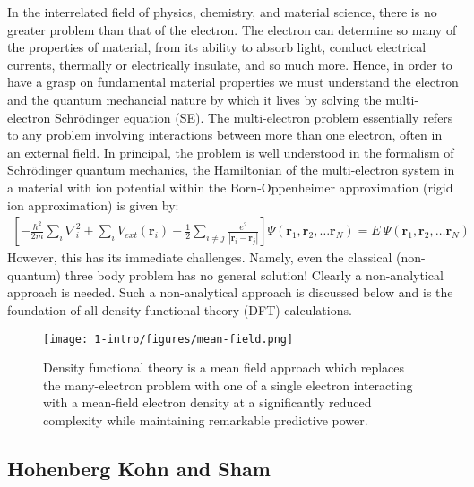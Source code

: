 In the interrelated field of physics, chemistry, and material science, there is no greater problem than that of the electron. The electron can determine so many of the properties of material, from its ability to absorb light, conduct electrical currents, thermally or electrically insulate, and so much more. Hence, in order to have a grasp on fundamental material properties we must understand the electron and the quantum mechancial nature by which it lives by solving the multi-electron Schr{\"o}dinger equation (SE). The multi-electron problem essentially refers to any problem involving interactions between more than one electron, often in an external field. In principal, the problem is well understood in the formalism of Schr{\"o}dinger quantum mechanics, the Hamiltonian of the multi-electron system in a material with ion potential within the Born-Oppenheimer approximation (rigid ion approximation) is given by:
\begin{align}
    \left[ -\frac{\hbar^2}{2m} \sum_i \nabla_i^2 + \sum_i V_{ext} (\textbf{r}_i) + \frac{1}{2} \sum_{i\neq j} \frac{e^2}{|\textbf{r}_i-\textbf{r}_j|} \right] \Psi(\textbf{r}_1,\textbf{r}_2,\ldots\textbf{r}_N) = E\ \Psi(\textbf{r}_1,\textbf{r}_2,\ldots\textbf{r}_N)
    \label{eq:multi-se}
\end{align}
However, this has its immediate challenges. Namely, even the classical (non-quantum) three body problem has no general solution! Clearly a non-analytical approach is needed. Such a non-analytical approach is discussed below and is the foundation of all density functional theory (DFT) calculations.

\begin{figure}[h]
\begin{center}
\texttt{[image: 1-intro/figures/mean-field.png]}
\caption{Density functional theory is a mean field approach which replaces the many-electron problem with one of a single electron interacting with a mean-field electron density at a significantly reduced complexity while maintaining remarkable predictive power.}  \label{intro:fig:mean}
\end{center}
\end{figure}

\subsection{Hohenberg Kohn and Sham}

